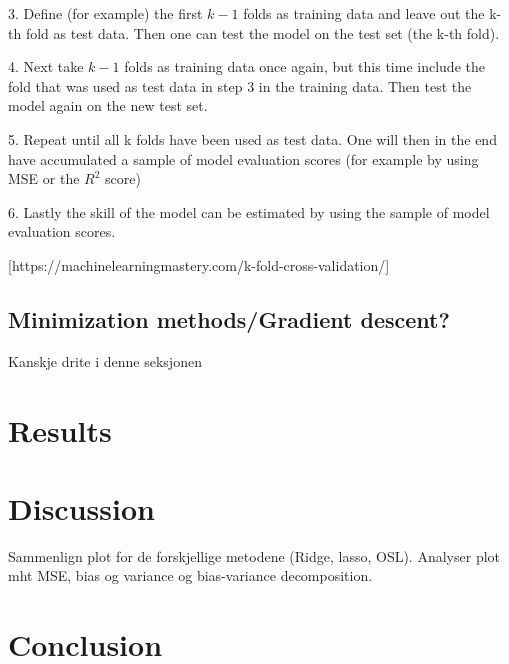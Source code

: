 \documentclass[a4paper,12pt]{article}
\begin{document}
3. Define (for example) the first $k-1$ folds as training data and leave out the k-th fold as test data. Then one can test the model on the test set (the k-th fold).\newline

4. Next take $k-1$ folds as training data once again, but this time include the fold that was used as test data in step 3 in the training data. Then test the model again on the new test set.\newline

5. Repeat until all k folds have been used as test data. One will then in the end have accumulated a sample of model evaluation scores (for example by using MSE or the $R^2$ score) \newline

6. Lastly the skill of the model can be estimated by using the sample of model evaluation scores.\newline

[https://machinelearningmastery.com/k-fold-cross-validation/]

\subsection{Minimization methods/Gradient descent?}
Kanskje drite i denne seksjonen

\section{Results}

\section{Discussion}
Sammenlign plot for de forskjellige metodene (Ridge, lasso, OSL). Analyser plot mht MSE, bias og variance og bias-variance decomposition.

\section{Conclusion}
\end{document}
